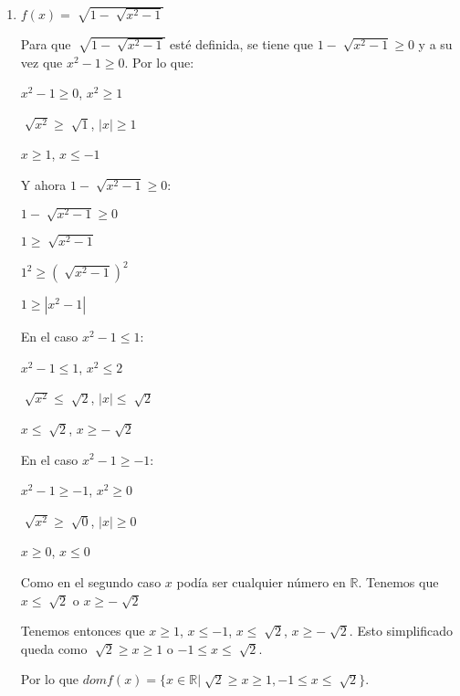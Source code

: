\documentclass[11pt, a4paper]{article}
\begin{document}
\begin{enumerate}
\begin{enumerate}
            \item $f(x)=\sqrt[]{1-\sqrt[]{x^2-1}}$
            
            Para que $\sqrt[]{1-\sqrt[]{x^2-1}}$ esté definida, se tiene que $1-\sqrt[]{x^2-1} \geq 0$ y a su
            vez que $x^2-1 \geq 0$. Por lo que:

            \begin{center}
                $x^2-1 \geq 0$,  $x^2 \geq 1$

                $\sqrt[]{x^2} \geq \sqrt[]{1}$, $|x| \geq 1$

                $x \geq 1$, $x \leq -1$
            \end{center}

            Y ahora $1-\sqrt[]{x^2-1} \geq 0$:
            \begin{center}
                $1-\sqrt[]{x^2-1} \geq 0$

                $1 \geq \sqrt[]{x^2-1}$ 
                
                $1^2 \geq (\sqrt[]{x^2-1})^2$ 

                $1 \geq |x^2-1|$
                
                En el caso $x^2-1 \leq 1$:

                $x^2-1\leq 1$, $x^2 \leq 2$

                $\sqrt[]{x^2}\leq \sqrt[]{2}$, $|x|\leq \sqrt[]{2}$

                $x \leq \sqrt[]{2}$, $x \geq - \sqrt[]{2}$

                En el caso $x^2-1 \geq -1$:

                $x^2-1 \geq -1$, $x^2\geq 0$

                $\sqrt[]{x^2} \geq \sqrt[]{0}$, $|x|\geq 0$

                $x \geq 0$, $x \leq 0$

                Como en el segundo caso $x$ podía ser cualquier número en $\mathbb{R}$. Tenemos que
                $x \leq \sqrt[]{2}$ o $x \geq - \sqrt[]{2}$
            \end{center}

            Tenemos entonces que $x \geq 1$, $x \leq -1$, $x \leq \sqrt[]{2}$, $x \geq - \sqrt[]{2}$.
            Esto simplificado queda como $\sqrt[]{2} \geq x \geq 1$ o $-1 \leq x \leq \sqrt[]{2}$. 
            
            Por lo que
            $dom f(x)= \{x \in \mathbb{R} | \sqrt[]{2} \geq x \geq 1, -1 \leq x \leq \sqrt[]{2}\}$.


\end{enumerate}
\end{enumerate}
\end{document}

